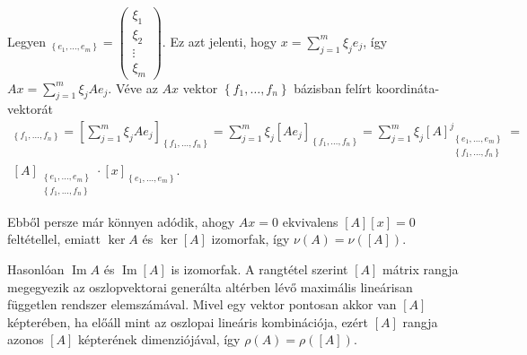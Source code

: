 \documentclass[a4paper, showtrims]{memoir}
\makeatletter
\renewenvironment{proof}[1][\proofname]
    {\par\pushQED{\qed}%
    \normalfont \topsep6\p@\@plus6\p@\relax
    \trivlist
    \item[\hskip\labelsep
        \itshape
    #1\@addpunct{:}]\ignorespaces}
    {\popQED\endtrivlist\@endpefalse}
\theoremstyle{plain}
\theoremstyle{remark}
\theoremstyle{definition}
\DeclareMathOperator{\im}{Im}
\makeatother
\begin{document}
\begin{proof}
	Legyen
	\begin{math}
		[x]_{\left\{ e_1,\ldots,e_m \right\}}
		=
		\begin{pmatrix}
			\xi_1 \\ \xi_2 \\ \vdots \\ \xi_m
		\end{pmatrix}.
	\end{math}
	Ez azt jelenti,
	hogy $x=\sum_{j=1}^m\xi_je_j$, így
	$Ax=\sum_{j=1}^m\xi_jAe_j$.
	Véve az $Ax$ vektor $\left\{ f_1,\ldots,f_n \right\}$ bázisban felírt koordináta-vektorát
	\begin{multline*}
		[Ax]_{\left\{ f_1,\ldots,f_n \right\}}
		=
		\left[ \sum_{j=1}^m\xi_jAe_j \right]_{\left\{ f_1,\ldots,f_n \right\}}
		=
		\sum_{j=1}^m\xi_j[Ae_j]_{\left\{ f_1,\ldots,f_n \right\}}
		=
		\sum_{j=1}^m\xi_j[A]_{\substack{\left\{ e_1,\ldots,e_m \right\}\\ \left\{ f_1,\ldots,f_n \right\}}}^j
		=\\
		[A]_{\substack{\left\{ e_1,\ldots,e_m \right\}\\ \left\{ f_1,\ldots,f_n \right\}}}
		\cdot
		[x]_{\left\{ e_1,\ldots,e_m \right\}}.
	\end{multline*}

	Ebből persze már könnyen adódik, ahogy $Ax=0$ ekvivalens $[A][x]=0$ feltétellel, emiatt
	$\ker A$ és $\ker [A]$ izomorfak,
	így $\nu(A)=\nu([A])$.

	Hasonlóan $\im A$ és $\im [A]$ is izomorfak.
	A rangtétel szerint $[A]$ mátrix rangja megegyezik az oszlopvektorai generálta altérben lévő maximális lineárisan
	független rendszer elemszámával.
	Mivel egy vektor pontosan akkor van $[A]$ képterében, ha előáll mint az oszlopai lineáris kombinációja,
	ezért $[A]$ rangja azonos $[A]$ képterének dimenziójával,
	így $\rho(A)=\rho([A])$.
\end{proof}
\end{document}
